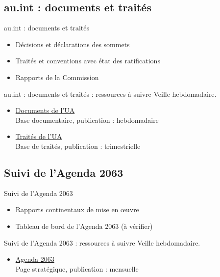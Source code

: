 \documentclass[aspectratio=169,11pt]{beamer}
\begin{document}
\subsection{au.int : documents et traités}
\begin{frame}{au.int : documents et traités}
\begin{itemize}
\item Décisions et déclarations des sommets
\item Traités et conventions avec état des ratifications
\item Rapports de la Commission
\end{itemize}
\end{frame}

\begin{frame}{au.int : documents et traités : ressources à suivre}
\small
Veille hebdomadaire.
\begin{itemize}
\item \href{https://au.int/en/documents}{Documents de l'UA}\\{\footnotesize Base documentaire, publication : hebdomadaire}
\item \href{https://au.int/en/treaties}{Traités de l'UA}\\{\footnotesize Base de traités, publication : trimestrielle}
\end{itemize}
\end{frame}

\subsection{Suivi de l'Agenda 2063}
\begin{frame}{Suivi de l'Agenda 2063}
\begin{itemize}
\item Rapports continentaux de mise en œuvre
\item Tableau de bord de l'Agenda 2063 (à vérifier)
\end{itemize}
\end{frame}

\begin{frame}{Suivi de l'Agenda 2063 : ressources à suivre}
\small
Veille hebdomadaire.
\begin{itemize}
\item \href{https://au.int/en/agenda2063/overview}{Agenda 2063}\\{\footnotesize Page stratégique, publication : mensuelle}
\end{itemize}
\end{frame}
\end{document}

